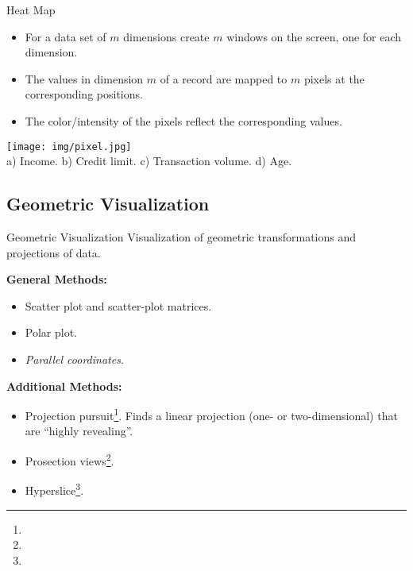 \begin{frame}{Heat Map}
	\vspace*{-0.5em}

	\begin{itemize}
		\item For a data set of $m$ dimensions create $m$ windows on the screen, one for each dimension.
		\item The values in dimension $m$ of a record are mapped to $m$ pixels at the corresponding positions.
		\item The color/intensity of the pixels reflect the corresponding values.
	\end{itemize}

	\vspace*{1.5em}
	\begin{center}
		\texttt{[image: img/pixel.jpg]}\\
		\vspace*{-0.5em}
		a) Income. \hspace{0.3cm} b) Credit limit. \hspace{0.1cm} c) Transaction volume. \hspace{0.2cm} d) Age.
	\end{center}

\end{frame}

\subsection{Geometric Visualization}

\begin{frame}{Geometric Visualization}
	Visualization of geometric transformations and projections of data.

	\vspace*{0.2cm}

	\textbf{General Methods:}
	\begin{itemize}
		\item Scatter plot and scatter-plot matrices.
		\item Polar plot.
		\item \textit{Parallel coordinates.}
	\end{itemize}

	\textbf{Additional Methods:}
	\begin{itemize}
		\item Projection pursuit\footnote{}.
		      Finds a linear projection (one- or two-dimensional) that are ``highly revealing''.
		\item Prosection views\footnote{}.
		\item Hyperslice\footnote{}.
	\end{itemize}
\end{frame}

